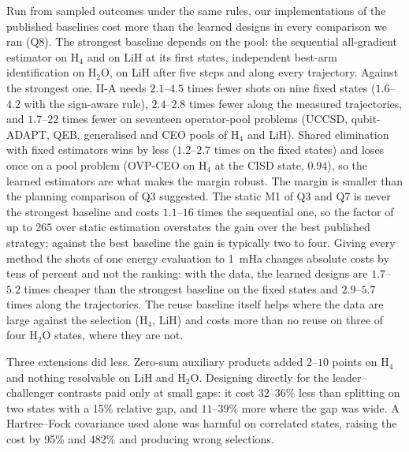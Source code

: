 \documentclass[aps,pra,reprint,superscriptaddress,nofootinbib]{revtex4-2}
\begin{document}
Run from sampled outcomes under the same rules, our implementations of the published baselines cost more than the learned designs in every comparison we ran (Q8). The strongest baseline depends on the pool: the sequential all-gradient estimator on H$_4$ and on LiH at its first states, independent best-arm identification on H$_2$O, on LiH after five steps and along every trajectory. Against the strongest one, II-A needs $2.1$--$4.5$ times fewer shots on nine fixed states ($1.6$--$4.2$ with the sign-aware rule), $2.4$--$2.8$ times fewer along the measured trajectories, and $1.7$--$22$ times fewer on seventeen operator-pool problems (UCCSD, qubit-ADAPT, QEB, generalised and CEO pools of H$_4$ and LiH). Shared elimination with fixed estimators wins by less ($1.2$--$2.7$ times on the fixed states) and loses once on a pool problem (OVP-CEO on H$_4$ at the CISD state, $0.94$), so the learned estimators are what makes the margin robust. The margin is smaller than the planning comparison of Q3 suggested. The static M1 of Q3 and Q7 is never the strongest baseline and costs $1.1$--$16$ times the sequential one, so the factor of up to $265$ over static estimation overstates the gain over the best published strategy; against the best baseline the gain is typically two to four. Giving every method the shots of one energy evaluation to 1~mHa changes absolute costs by tens of percent and not the ranking: with the data, the learned designs are $1.7$--$5.2$ times cheaper than the strongest baseline on the fixed states and $2.9$--$5.7$ times along the trajectories. The reuse baseline itself helps where the data are large against the selection (H$_4$, LiH) and costs more than no reuse on three of four H$_2$O states, where they are not.

Three extensions did less. Zero-sum auxiliary products added $2$--$10$ points on H$_4$ and nothing resolvable on LiH and H$_2$O. Designing directly for the leader--challenger contrasts paid only at small gaps: it cost $32$--$36\%$ less than splitting on two states with a 15\% relative gap, and $11$--$39\%$ more where the gap was wide. A Hartree--Fock covariance used alone was harmful on correlated states, raising the cost by 95\% and 482\% and producing wrong selections.
\end{document}
